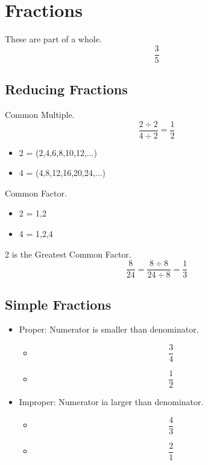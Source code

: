 \documentclass[]{article}
\begin{document}
\section{Fractions}
These are part of a whole.
\begin{equation}
	\frac {3}{5} 
\end{equation}


\subsection{Reducing Fractions}
Common Multiple.
\begin{equation}
	\frac {2 \div 2}{4 \div 2} = \frac{1}{2}
\end{equation}
	\begin{itemize}
		\item 2 = (2,4,6,8,10,12,...)
		\item 4 = (4,8,12,16,20,24,...)
	\end{itemize}
Common Factor.
	\begin{itemize}
		\item 2 = 1,2
		\item 4 = 1,2,4
	\end{itemize}
		2 is the Greatest Common Factor.
\begin{equation}
\frac {8}{24} = \frac {8 \div 8}{24 \div 8} = \frac {1}{3}
\end{equation}


\subsection{Simple Fractions}
\begin{itemize}
	\item Proper: Numerator is smaller than denominator. 
	\begin{itemize}
		\item \begin{equation}
			\frac{3}{4} 
		\end{equation}
		\item \begin{equation}
			\frac{1}{2}
		\end{equation}
	\end{itemize}
	\item Improper: Numerator ia larger than denominator. 
		\begin{itemize}
			\item \begin{equation}
			\frac{4}{3} 
			\end{equation}
			\item \begin{equation}
			\frac{2}{1}
			\end{equation}
		\end{itemize}
\end{itemize}
\end{document}
